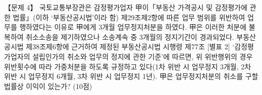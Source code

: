 \begin{longquestion}{【문제 4】}
국토교통부장관은 감정평가업자 甲이「부동산 가격공시 및 감정평가에 관한 법률」(이하 ‘부동산공시법’이라 함) 제29조제2항에 따른 업무 범위를 위반하여 업무를 행하였다는 이유로 甲에게 3개월 업무정지처분을 하였다. 甲은 이러한 처분에 불복하여 취소소송을 제기하였으나 소송계속 중 3개월의 정지기간이 경과되었다. 부동산공시법 제38조제6항에 근거하여 제정된 부동산공시법 시행령 제77조 [별표 2] ‘감정평가업자의 설립인가의 취소와 업무의 정지에 관한 기준’에 따르면, 위 위반행위의 경우 위반횟수에 따라 가중처분을 하도록 규정하고 있다(1차 위반 시 업무정지 3개월, 2차 위반 시 업무정지 6개월, 3차 위반 시 업무정지 1년). 甲은 업무정지처분의 취소를 구할 법률상 이익이 있는가? (10점) \par
\end{longquestion}
